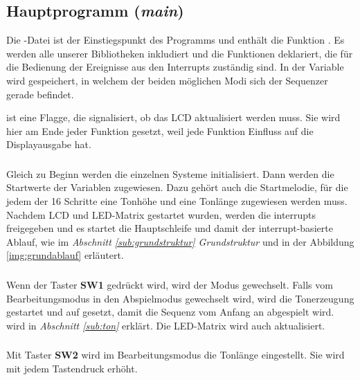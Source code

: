 \subsection{Hauptprogramm (\emph{main})}
Die -Datei ist der Einstiegspunkt des Programms und enthält die Funktion . Es werden alle unserer Bibliotheken inkludiert und die Funktionen deklariert, die für die Bedienung der Ereignisse aus den Interrupts zuständig sind. In der Variable  wird gespeichert, in welchem der beiden möglichen Modi sich der Sequenzer gerade befindet. \par \noindent 
{} ist eine Flagge, die signalisiert, ob das LCD aktualisiert werden muss. Sie wird hier am Ende jeder Funktion gesetzt, weil jede Funktion Einfluss auf die Displayausgabe hat.

\subsubsection{} %
\label{ssub:int main}
Gleich zu Beginn werden die einzelnen Systeme initialisiert. Dann werden die Startwerte der Variablen zugewiesen. Dazu gehört auch die Startmelodie, für die jedem der 16 Schritte eine Tonhöhe und eine Tonlänge zugewiesen werden muss. Nachdem LCD und LED-Matrix gestartet wurden, werden die interrupts freigegeben und es startet die Hauptschleife und damit der interrupt-basierte Ablauf, wie im \emph{Abschnitt \ref{sub:grundstruktur} Grundstruktur} und in der Abbildung \ref{img:grundablauf} erläutert.

\subsubsection{} %
\label{ssub:void_button_sw1_pressed}
Wenn der Taster \textbf{SW1} gedrückt wird, wird der Modus gewechselt. Falls vom Bearbeitungsmodus in den Abspielmodus gewechselt wird, wird die Tonerzeugung gestartet und  auf  gesetzt, damit die Sequenz vom Anfang an abgespielt wird.  wird in \emph{Abschnitt \ref{sub:ton}} erklärt. Die LED-Matrix wird auch aktualisiert.

\subsubsection{} %
\label{ssub:void_button_sw2_pressed}
Mit Taster \textbf{SW2} wird im Bearbeitungsmodus die Tonlänge eingestellt. Sie wird mit jedem Tastendruck erhöht.

